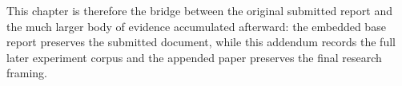 This chapter is therefore the bridge between the original submitted report and
the much larger body of evidence accumulated afterward: the embedded base report
preserves the submitted document, while this addendum records the full later
experiment corpus and the appended paper preserves the final research framing.
